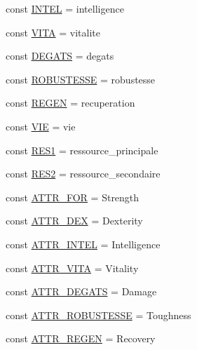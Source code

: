 \begin{DoxyCompactItemize}
\item 
const \hyperlink{class_hero_a71e6a572e24cbe3edf59791b84df8ee4}{I\+N\+T\+EL} = \textquotesingle{}intelligence\textquotesingle{}
\item 
const \hyperlink{class_hero_ade7f612b26ba8dd1df6b335abbece9de}{V\+I\+TA} = \textquotesingle{}vitalite\textquotesingle{}
\item 
const \hyperlink{class_hero_ab1e1334b46c84d771c2f524916be689b}{D\+E\+G\+A\+TS} = \textquotesingle{}degats\textquotesingle{}
\item 
const \hyperlink{class_hero_acde52ad608e3b20bdf32055320e45854}{R\+O\+B\+U\+S\+T\+E\+S\+SE} = \textquotesingle{}robustesse\textquotesingle{}
\item 
const \hyperlink{class_hero_a1c41f749aaa77bbe9b0cab282234426a}{R\+E\+G\+EN} = \textquotesingle{}recuperation\textquotesingle{}
\item 
const \hyperlink{class_hero_ab15e50326f1f05174b01acf89b54626c}{V\+IE} = \textquotesingle{}vie\textquotesingle{}
\item 
const \hyperlink{class_hero_a0ce73cd2a000323e72b2aaff1d14b638}{R\+E\+S1} = \textquotesingle{}ressource\+\_\+principale\textquotesingle{}
\item 
const \hyperlink{class_hero_ac43bd6ccbfcd51139f3782a030dd4a2a}{R\+E\+S2} = \textquotesingle{}ressource\+\_\+secondaire\textquotesingle{}
\item 
const \hyperlink{class_hero_ab37eaa1b19e2534501cfe184ee22d436}{A\+T\+T\+R\+\_\+\+F\+OR} = \textquotesingle{}Strength\textquotesingle{}
\item 
const \hyperlink{class_hero_ab0411bd053a2e3850995f682a73c6045}{A\+T\+T\+R\+\_\+\+D\+EX} = \textquotesingle{}Dexterity\textquotesingle{}
\item 
const \hyperlink{class_hero_a1982ce946f07283b7ab33961aa5e042f}{A\+T\+T\+R\+\_\+\+I\+N\+T\+EL} = \textquotesingle{}Intelligence\textquotesingle{}
\item 
const \hyperlink{class_hero_a5d896e1773903e8496b01bff06bcdd62}{A\+T\+T\+R\+\_\+\+V\+I\+TA} = \textquotesingle{}Vitality\textquotesingle{}
\item 
const \hyperlink{class_hero_a1c679372dc5da6894a1f905251a79ff4}{A\+T\+T\+R\+\_\+\+D\+E\+G\+A\+TS} = \textquotesingle{}Damage\textquotesingle{}
\item 
const \hyperlink{class_hero_aacaac92597879257696115b56bedc9cc}{A\+T\+T\+R\+\_\+\+R\+O\+B\+U\+S\+T\+E\+S\+SE} = \textquotesingle{}Toughness\textquotesingle{}
\item 
const \hyperlink{class_hero_aa90077e32ebe6c70d4659b14859aa6bf}{A\+T\+T\+R\+\_\+\+R\+E\+G\+EN} = \textquotesingle{}Recovery\textquotesingle{}

\end{DoxyCompactItemize}
